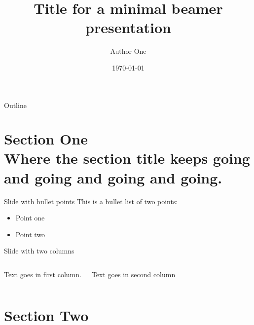 \documentclass[aspectratio=169, 12pt]{beamer} %
\title{Title for a minimal beamer presentation} %
\author{Author One}               %
\institute{Name of department/affiliation}         %
\date{\today}                 %
\begin{document}

\maketitle

  

\begin{frame}{Outline}
  \tableofcontents
\end{frame}

%

\section{Section One\\Where the section title keeps going and going and going and going.}

\begin{frame}{Slide with bullet points}
  This is a bullet list of two points:
    \begin{itemize}
    \item Point one
        \item Point two
  \end{itemize}
\end{frame}

\begin{frame}{Slide with two columns}
  \begin{columns}
        Text goes in first column.
        
        Text goes in second column
  \end{columns}
\end{frame}

\section{Section Two}
\end{document}

